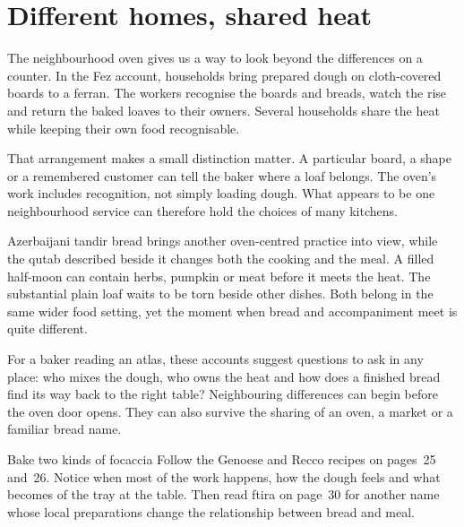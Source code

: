 \section{Different homes, shared heat}
The neighbourhood oven gives us a way to look beyond the differences on a counter. In the Fez account, households bring prepared dough on cloth-covered boards to a ferran. The workers recognise the boards and breads, watch the rise and return the baked loaves to their owners. Several households share the heat while keeping their own food recognisable.\citep{fezferran}

That arrangement makes a small distinction matter. A particular board, a shape or a remembered customer can tell the baker where a loaf belongs. The oven's work includes recognition, not simply loading dough. What appears to be one neighbourhood service can therefore hold the choices of many kitchens.

Azerbaijani tandir bread brings another oven-centred practice into view, while the qutab described beside it changes both the cooking and the meal. A filled half-moon can contain herbs, pumpkin or meat before it meets the heat. The substantial plain loaf waits to be torn beside other dishes. Both belong in the same wider food setting, yet the moment when bread and accompaniment meet is quite different.\citep{tandir,qutabvarieties}

For a baker reading an atlas, these accounts suggest questions to ask in any place: who mixes the dough, who owns the heat and how does a finished bread find its way back to the right table? Neighbouring differences can begin before the oven door opens. They can also survive the sharing of an oven, a market or a familiar bread name.

\begin{breadnote}{Bake two kinds of focaccia}
Follow the Genoese and Recco recipes on pages~25 and~26. Notice when most of the work happens, how the dough feels and what becomes of the tray at the table. Then read ftira on page~30 for another name whose local preparations change the relationship between bread and meal.
\end{breadnote}
